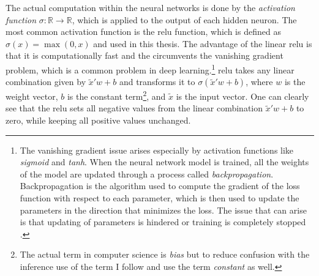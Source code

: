 The actual computation within the neural networks is done by the \textit{activation function} $ \sigma : \mathbb{R} \to \mathbb{R} $, which is applied to the output of each hidden neuron.
The most common activation function is the \ac{relu} function, which is defined as $ \sigma(x) = \max(0, x) $ and used in this thesis.
The advantage of the linear \ac{relu} is that it is computationally fast and the circumvents the vanishing gradient problem, which is a common problem in deep learning.\footnote[1]{The vanishing gradient issue arises especially by activation functions like \textit{sigmoid} and \textit{tanh}.
When the neural network model is trained, all the weights of the model are updated through a process called \textit{backpropagation}.
Backpropagation is the algorithm used to compute the gradient of the loss function with respect to each parameter, which is then used to update the parameters in the direction that minimizes the loss.
The issue that can arise is that updating of parameters is hindered or training is completely stopped \citep{abuqaddom2021oriented}.}
\ac{relu} takes any linear combination given by $\tilde{x}' w + b$ and transforms it to $ \sigma(\tilde{x}' w + b)$, where $w$ is the weight vector, $b$ is the constant term\footnote[2]{The actual term in computer science is \textit{bias} but to reduce confusion with the inference use of the term I follow \citet{farrellDeepNeuralNetworks2021} and use the term \textit{constant} as well.}, and $\tilde{x}$ is the input vector.
One can clearly see that the \ac{relu} sets all negative values from the linear combination $\tilde{x}' w + b$ to zero, while keeping all positive values unchanged.

